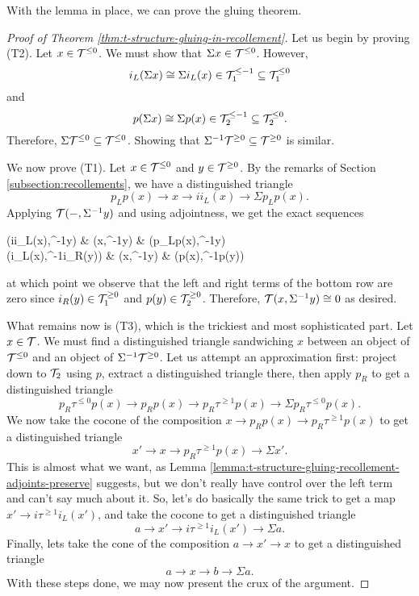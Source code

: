 With the lemma in place, we can prove the gluing theorem.

\begin{proof}[Proof of Theorem \ref{thm:t-structure-gluing-in-recollement}]
Let us begin by proving (T2). Let \(x\in\mathcal{T}^{\leq 0}\). We must show that \(\Sigma x \in\mathcal{T}^{\leq 0}\). However,
\[ i_L(\Sigma x) \cong \Sigma i_L(x) \in \mathcal{T}_1^{\leq -1} \subseteq \mathcal{T}_1^{\leq 0} \]
and
\[ p(\Sigma x) \cong \Sigma p(x) \in \mathcal{T}_2^{\leq -1} \subseteq \mathcal{T}_2^{\leq 0}. \]
Therefore, \(\Sigma\mathcal{T}^{\leq 0}\subseteq\mathcal{T}^{\leq 0}\). Showing that \(\Sigma^{-1}\mathcal{T}^{\geq 0}\subseteq\mathcal{T}^{\geq 0}\) is similar.

We now prove (T1). Let \(x\in\mathcal{T}^{\leq 0}\) and \(y\in\mathcal{T}^{\geq 0}\). By the remarks of Section \ref{subsection:recollements}, we have a distinguished triangle
\[ p_Lp(x) \to x \to ii_L(x) \to \Sigma p_Lp(x). \]
Applying \(\mathcal{T}(-,\Sigma^{-1}y)\) and using adjointness, we get the exact sequences
\begin{diagram*}[cramped]
	\calT(ii_L(x),\Sigma^{-1}y)  \ar[r] & \calT(x,\Sigma^{-1}y) \ar[d,equal] \ar[r] & \calT(p_Lp(x),\Sigma^{-1}y)  \\
	\calT(i_L(x),\Sigma^{-1}i_R(y)) \ar[r] & \calT(x,\Sigma^{-1}y) \ar[r] & \calT(p(x),\Sigma^{-1}p(y))
\end{diagram*}
at which point we observe that the left and right terms of the bottom row are zero since \(i_R(y)\in\mathcal{T}_1^{\geq 0}\) and \(p(y)\in\mathcal{T}_2^{\geq 0}\). Therefore,
\(\mathcal{T}(x,\Sigma^{-1}y)\cong 0\) as desired.

What remains now is (T3), which is the trickiest and most sophisticated part. Let \(x\in\mathcal{T}\). We must find a distinguished triangle sandwiching \(x\)
between an object of \(\mathcal{T}^{\leq 0}\) and an object of \(\Sigma^{-1}\mathcal{T}^{\geq 0}\). Let us attempt an approximation first: project down to \(\mathcal{T}_2\) using \(p\),
extract a distinguished triangle there, then apply \(p_R\) to get a distinguished triangle
\[ p_R\tau^{\leq 0}p(x) \to p_Rp(x) \to p_R\tau^{\geq 1}p(x) \to \Sigma p_R\tau^{\leq 0}p(x). \]
We now take the cocone of the composition \(x \to p_Rp(x) \to p_R\tau^{\geq 1}p(x)\) to get a distinguished triangle
\[ x' \to x \to p_R\tau^{\geq 1}p(x) \to \Sigma x'. \]
This is almost what we want, as Lemma \ref{lemma:t-structure-gluing-recollement-adjoints-preserve} suggests, but we don't really have control over the left term and can't say much about it. So, let's do basically the same trick
to get a map \(x' \to i\tau^{\geq 1}i_L(x')\), and take the cocone to get a distinguished triangle
\[ a \to x' \to i\tau^{\geq 1}i_L(x') \to \Sigma a. \]
Finally, lets take the cone of the composition \(a \to x' \to x\) to get a distinguished triangle
\[ a \to x \to b \to \Sigma a. \]
With these steps done, we may now present the crux of the argument.


\end{proof}
